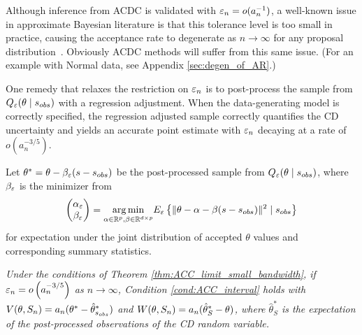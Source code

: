 Although inference from ACDC is validated with $\varepsilon_n=o(a_n^{-1})$, a well-known issue in approximate Bayesian literature is that this tolerance level is too small in practice, causing the acceptance rate to degenerate 
as $n \rightarrow \infty$ for any proposal distribution~\cite[]{Li2016}. Obviously ACDC methods will suffer from this same issue. (For an example with Normal data, see Appendix \ref{sec:degen_of_AR}.)

One remedy that relaxes the restriction on $\varepsilon_n$  %
is to post-process the sample from $Q_{\varepsilon}(\theta \mid s_{obs})$ with a regression adjustment\cite[]{beaumont2002}. When the data-generating model is correctly specified, the regression adjusted sample correctly quantifies the CD uncertainty %
and yields an accurate point estimate with $\varepsilon_n$ decaying at a rate of $o(a_{n}^{-3/5})$\cite[]{Li2017}. %
	
Let ${}{\theta}^{*}={}{\theta}-\beta_{\varepsilon}({}{s}-{}{s}_{{\relax obs}})$ be the post-processed sample from $Q_{\varepsilon}(\theta \mid s_{obs})$, where $\beta_{\varepsilon}$ is the minimizer from 
\begin{equation*}
 \begin{pmatrix}\alpha_{\varepsilon}\\ \beta_{\varepsilon}\end{pmatrix}=
\underset{\alpha\in\mathbb{R}^p,\beta\in\mathbb{R}^{d\times p}}{\arg\min} 
E_{\varepsilon}\left\{\|{}{\theta}-\alpha-\beta({}{s}-{}{s}_{{\relax obs}})\|^{2}\mid {}{s}_{{\relax obs}}\right\} 
\end{equation*}
for expectation under the joint distribution of accepted $\theta$ values and corresponding summary statistics. %

\begin{thm}\label{thm:ACC_limit_large_bandwidth}
{\it Under the conditions of Theorem \ref{thm:ACC_limit_small_bandwidth}, 
if $\varepsilon_{n}=o\left(a_{n}^{-3/5}\right)$ as $n\rightarrow\infty$, Condition \ref{cond:ACC_interval} holds with 
$V({}{\theta},S_n)=a_{n}({}{\theta}^{*}-\hat{\theta}_{s_{obs}}^*)$ and 
$W({}{\theta},S_{n})=a_{n}(\hat{\theta}_{S}^*-{}{\theta})$, 
where $\hat{\theta}_{S}^{*}$ is the expectation of the post-processed observations of the CD random variable.  }
\end{thm}
		
